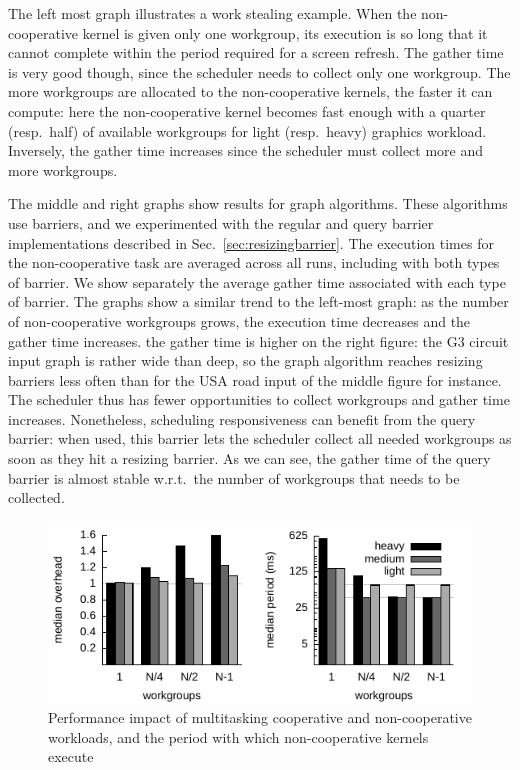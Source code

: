 \documentclass[sigconf]{acmart}
\newcommand{\mysec}{Sec.~}
\begin{document}
{The left most graph illustrates a work
stealing example.  When the non-cooperative kernel is given only one
workgroup, its execution is so long that it cannot complete within the
period required for a screen refresh. The gather time is very good
though, since the scheduler needs to collect only one workgroup.  The
more workgroups are allocated to the non-cooperative kernels, the
faster it can compute: here the non-cooperative kernel becomes fast
enough with a quarter (resp.\ half) of available workgroups for light
(resp.\ heavy) graphics workload. Inversely, the gather time increases
since the scheduler must collect more and more workgroups.

The middle and right graphs show results for graph algorithms.  These
algorithms use barriers, and we experimented with the regular and
query barrier implementations described in
\mysec\ref{sec:resizingbarrier}.  The execution times for the
non-cooperative task are averaged across all runs, including with both
types of barrier.  We show separately the average gather time
associated with each type of barrier.  The graphs show a similar trend
to the left-most graph: as the number of non-cooperative workgroups
grows, the execution time decreases and the gather time
increases.%
%
the gather time is higher on the right figure: the G3 circuit input
graph is rather wide than deep, so the graph algorithm reaches
resizing barriers less often than for the USA road input of the middle
figure for instance. The scheduler thus has fewer opportunities to
collect workgroups and gather time increases. Nonetheless, scheduling
responsiveness can benefit from the query barrier: when used, this
barrier lets the scheduler collect all needed workgroups as soon as
they hit a resizing barrier. As we can see, the gather time of the
query barrier is almost stable w.r.t.\ the number of workgroups that
needs to be collected.


\begin{figure}
\includegraphics[width=\columnwidth]{heavy.pdf}
\caption{Performance impact of multitasking cooperative and non-cooperative workloads, and the period with which non-cooperative kernels execute}\label{fig:performance}
\end{figure}


}
\end{document}
